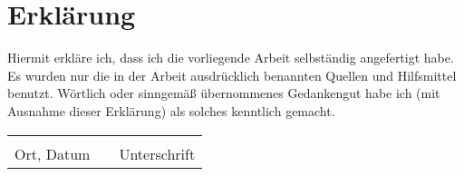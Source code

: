 
\section*{Erklärung}

Hiermit erkläre ich, dass ich die vorliegende Arbeit selbständig angefertigt habe. Es wurden nur die in der Arbeit ausdrücklich benannten Quellen und Hilfsmittel benutzt. Wörtlich oder sinngemäß übernommenes Gedankengut habe ich (mit Ausnahme dieser Erklärung) als solches kenntlich gemacht.
\vspace{4\baselineskip}

\begin{tabular}{lp{2em}l}
 \hspace{5cm}   && \hspace{4cm} \\
 \cline{1-1}\cline{3-3}
 Ort, Datum     && Unterschrift
\end{tabular} 
\thispagestyle{empty}
